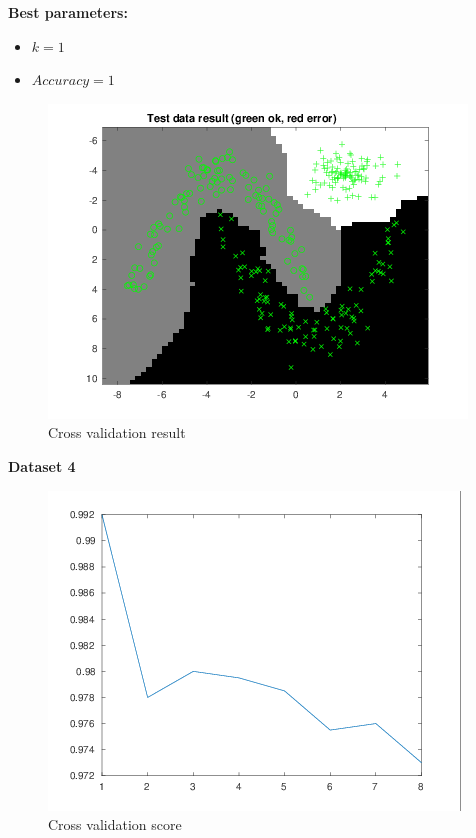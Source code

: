 \documentclass[a4paper,12pt]{article}
\begin{document}
\textbf{Best parameters:}
\begin{itemize}
\item $k = 1$
\item $Accuracy = 1$
\end{itemize}

\begin{figure}[H]
\centering
\caption{Cross validation result}\label{fig:kNN-3-cv}
  \begin{minipage}[]{1\textwidth}
  \includegraphics[width=\textwidth]{figures/kNN_3_cv.png}
  \end{minipage}
\end{figure}


\noindent \textbf{Dataset 4}

\begin{figure}[H]
\centering
\caption{Cross validation score}\label{fig:kNN-4-cv-score}
  \begin{minipage}[]{1\textwidth}
  \includegraphics[width=\textwidth]{figures/kNN_4_score.png}
  \end{minipage}
\end{figure}
\end{document}
